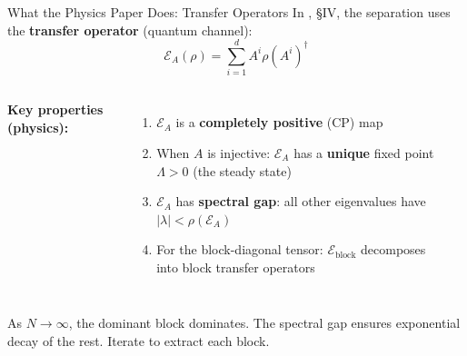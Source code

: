 \documentclass[aspectratio=169,10pt]{beamer}
\begin{document}
\begin{frame}{What the Physics Paper Does: Transfer Operators}
\vspace{-0.3em}
{\small In \cite{Cirac2021Matrix}, \S IV, the separation uses the \textbf{transfer operator} (quantum channel):}
\[
\mathcal{E}_A(\rho) = \sum_{i=1}^d A^i \rho (A^i)^\dagger
\]

\vspace{-0.2em}
\begin{columns}[T]
{\small\textbf{Key properties (physics):}}
\begin{enumerate}\itemsep0.15em
  \item {\small $\mathcal{E}_A$ is a \textbf{completely positive} (CP) map}
  \item {\small When $A$ is injective: $\mathcal{E}_A$ has a \textbf{unique} fixed point $\Lambda > 0$ (the steady state)}
  \item {\small $\mathcal{E}_A$ has \textbf{spectral gap}: all other eigenvalues have $|\lambda| < \rho(\mathcal{E}_A)$}
  \item {\small For the block-diagonal tensor: $\mathcal{E}_{\text{block}}$ decomposes into block transfer operators}
\end{enumerate}

\begin{center}
\begin{tenkz}[rows={ket,bra}, cols=1, west=open, east={cup=$\rho$}]
   \\
\end{tenkz}
\end{center}
\end{columns}

\vspace{0.3em}
{\small As $N \to \infty$, the dominant block dominates. The spectral gap ensures exponential decay of the rest. Iterate to extract each block.}
\end{frame}
\end{document}
